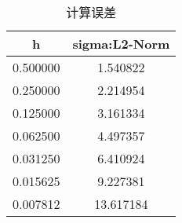 \begin{table}[htb]
\caption{计算误差}
\begin{tabular}{cc}
\toprule
h & sigma:L2-Norm \\
\midrule
0.500000 & 1.540822 \\
0.250000 & 2.214954 \\
0.125000 & 3.161334 \\
0.062500 & 4.497357 \\
0.031250 & 6.410924 \\
0.015625 & 9.227381 \\
0.007812 & 13.617184 \\
\bottomrule
\end{tabular}
\end{table}
